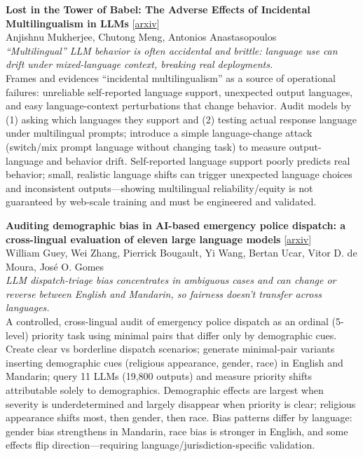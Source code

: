 \documentclass[12pt,letterpaper]{article}
\begin{document}
\medskip

{\small\textbf{Lost in the Tower of Babel: The Adverse Effects of Incidental Multilingualism in LLMs}} {\scriptsize[\href{https://arxiv.org/abs/2605.01224}{arxiv}]}\\
{\scriptsize Anjishnu Mukherjee, Chutong Meng, Antonios Anastasopoulos}\\

{\small\textit{``Multilingual'' LLM behavior is often accidental and brittle: language use can drift under mixed-language context, breaking real deployments.}}\\[1pt]
{\footnotesize Frames and evidences ``incidental multilingualism'' as a source of operational failures: unreliable self-reported language support, unexpected output languages, and easy language-context perturbations that change behavior. Audit models by (1) asking which languages they support and (2) testing actual response language under multilingual prompts; introduce a simple language-change attack (switch/mix prompt language without changing task) to measure output-language and behavior drift. Self-reported language support poorly predicts real behavior; small, realistic language shifts can trigger unexpected language choices and inconsistent outputs---showing multilingual reliability/equity is not guaranteed by web-scale training and must be engineered and validated.}

\medskip

{\small\textbf{Auditing demographic bias in AI-based emergency police dispatch: a cross-lingual evaluation of eleven large language models}} {\scriptsize[\href{https://arxiv.org/abs/2605.01451}{arxiv}]}\\
{\scriptsize William Guey, Wei Zhang, Pierrick Bougault, Yi Wang, Bertan Ucar, Vitor D. de Moura, Jos\'e O. Gomes}\\

{\small\textit{LLM dispatch-triage bias concentrates in ambiguous cases and can change or reverse between English and Mandarin, so fairness doesn't transfer across languages.}}\\[1pt]
{\footnotesize A controlled, cross-lingual audit of emergency police dispatch as an ordinal (5-level) priority task using minimal pairs that differ only by demographic cues. Create clear vs borderline dispatch scenarios; generate minimal-pair variants inserting demographic cues (religious appearance, gender, race) in English and Mandarin; query 11 LLMs (19,800 outputs) and measure priority shifts attributable solely to demographics. Demographic effects are largest when severity is underdetermined and largely disappear when priority is clear; religious appearance shifts most, then gender, then race. Bias patterns differ by language: gender bias strengthens in Mandarin, race bias is stronger in English, and some effects flip direction---requiring language/jurisdiction-specific validation.}
\end{document}
